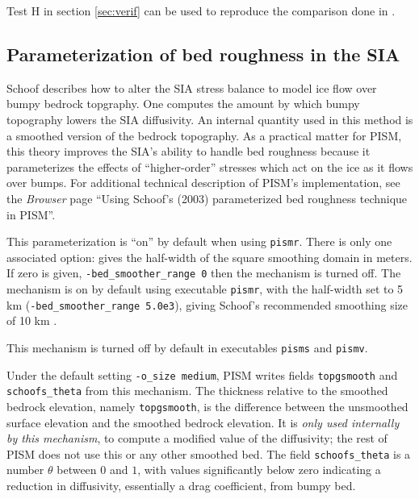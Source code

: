 Test H in section \ref{sec:verif} can be used to reproduce the comparison done in \cite{BLKfastearth}.


\subsection{Parameterization of bed roughness in the SIA} \label{subsect:bedsmooth} 

Schoof \cite{Schoofbasaltopg2003} describes how to alter the SIA stress balance to model ice flow over bumpy bedrock topgraphy.  One computes the amount by which bumpy topography lowers the SIA diffusivity.  An internal quantity used in this method is a smoothed version of the bedrock topography.  As a practical matter for PISM, this theory improves the SIA's ability to handle bed roughness because it parameterizes the effects of ``higher-order'' stresses which act on the ice as it flows over bumps.  For additional technical description of PISM's implementation, see the \emph{Browser} page ``Using Schoof's (2003) parameterized bed roughness technique in PISM''.

This parameterization is ``on'' by default when using \texttt{pismr}.  There is only one associated option:  gives the half-width of the square smoothing domain in meters.  If zero is given, \texttt{-bed_smoother_range 0} then the mechanism is turned off.  The mechanism is on by default using executable \texttt{pismr}, with the half-width set to 5 km (\texttt{-bed_smoother_range 5.0e3}), giving Schoof's recommended smoothing size of 10 km \cite{Schoofbasaltopg2003}.

This mechanism is turned off by default in executables \texttt{pisms} and \texttt{pismv}.

Under the default setting \texttt{-o_size medium}, PISM writes fields \texttt{topgsmooth} and \texttt{schoofs_theta} from this mechanism.  The thickness relative to the smoothed bedrock elevation, namely \texttt{topgsmooth}, is the difference between the unsmoothed surface elevation and the smoothed bedrock elevation.  It is \emph{only used internally by this mechanism}, to compute a modified value of the diffusivity; the rest of PISM does not use this or any other smoothed bed.  The field \texttt{schoofs_theta} is a number $\theta$ between $0$ and $1$, with values significantly below zero indicating a reduction in diffusivity, essentially a drag coefficient, from bumpy bed.



